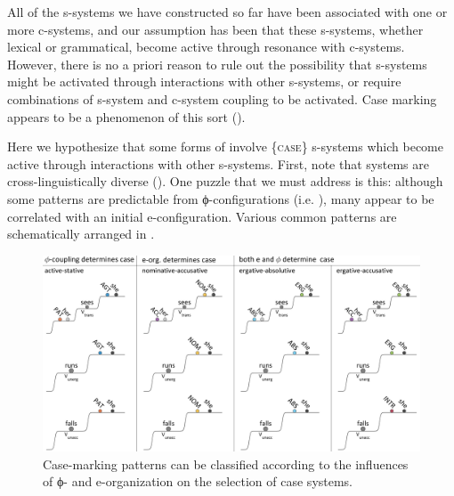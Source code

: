 All of the s-systems we have constructed so far have been associated with one or more c-systems, and our assumption has been that these s-systems, whether lexical or grammatical, become active through resonance with c-systems. However, there is no a priori reason to rule out the possibility that s-systems might be activated through interactions with other s-systems, or require combinations of s-system and c-system coupling to be activated. Case marking appears to be a phenomenon of this sort (\citealt{BobaljikWurmbrand2008,MalchukovSpencer2008}).

  Here we hypothesize that some forms of  involve \{\textsc{case}\} s-systems which become active through interactions with other s-systems. First, note that  systems are cross-linguistically diverse (\citeauthor{MalchukovSpencer2008}\linebreak\citeyear{MalchukovSpencer2008}). One puzzle that we must address is this: although some  patterns are predictable from ϕ-configurations (i.e. ), many appear to be correlated with an initial e-configuration. Various common  patterns are schematically arranged in {}. 

  
\begin{figure}
\includegraphics[width=\textwidth]{figures/Tilsen-img70.png}
\caption{Case-marking patterns can be classified according to the influences of ϕ- and e-organization on the selection of case systems.}
\label{fig:4:20}
\end{figure}
 

